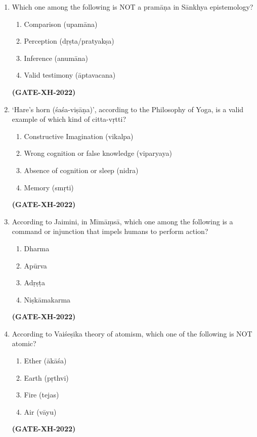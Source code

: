 \documentclass[journal]{IEEEtran}
\begin{document}
\begin{enumerate}
\item Which one among the following is NOT a pramāṇa in Sānkhya epistemology?  
\begin{multicols}{2}
\begin{enumerate}
\item Comparison (upamāna)  
\item Perception (dṛṣta/pratyakṣa)  
\item Inference (anumāna)  
\item Valid testimony (āptavacana)  
\end{enumerate}
\end{multicols}
\hfill\textbf{(GATE-XH-2022)}

\item ‘Hare’s horn (śaśa-viṣāṇa)’, according to the Philosophy of Yoga, is a valid example of which kind of citta-vṛtti?  
\begin{enumerate}
\item Constructive Imagination (vikalpa)  
\item Wrong cognition or false knowledge (viparyaya)  
\item Absence of cognition or sleep (nidra)  
\item Memory (smṛti)  
\end{enumerate}
\hfill\textbf{(GATE-XH-2022)}

\item According to Jaimini, in Mīmāṃsā, which one among the following is a command or injunction that impels humans to perform action?  
\begin{multicols}{4}
\begin{enumerate}
\item Dharma  
\item Apūrva  
\item Adṛṣṭa  
\item Niṣkāmakarma  
\end{enumerate}
\end{multicols}
\hfill\textbf{(GATE-XH-2022)}

\item According to Vaiśeṣika theory of atomism, which one of the following is NOT atomic?  
\begin{multicols}{4}
\begin{enumerate}
\item Ether (ākāśa)  
\item Earth (pṛthvi)  
\item Fire (tejas)  
\item Air (vāyu)  
\end{enumerate}
\end{multicols}
\hfill\textbf{(GATE-XH-2022)}


\end{enumerate}
\end{document}
